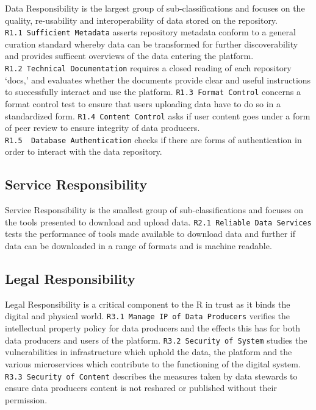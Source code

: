\documentclass{article}
\begin{document}
Data Responsibility is the largest group of sub-classifications and
focuses on the quality, re-usability and interoperability of data stored
on the repository. \texttt{R1.1\ Sufficient\ Metadata} asserts
repository metadata conform to a general curation standard whereby data
can be transformed for further discoverability and provides sufficent
overviews of the data entering the platform.
\texttt{R1.2\ Technical\ Documentation} requires a closed reading of
each repository `docs,' and evaluates whether the documents provide
clear and useful instructions to successfully interact and use the
platform. \texttt{R1.3\ Format\ Control} concerns a format control test
to ensure that users uploading data have to do so in a standardized
form. \texttt{R1.4\ Content\ Control} asks if user content goes under a
form of peer review to ensure integrity of data producers.
\texttt{R1.5\ \ Database\ Authentication} checks if there are forms of
authentication in order to interact with the data repository.

\hypertarget{service-responsibility}{%
\subsection{Service Responsibility}\label{service-responsibility}}

Service Responsibility is the smallest group of sub-classifications and
focuses on the tools presented to download and upload data.
\texttt{R2.1\ Reliable\ Data\ Services} tests the performance of tools
made available to download data and further if data can be downloaded in
a range of formats and is machine readable.

\hypertarget{legal-responsibility}{%
\subsection{Legal Responsibility}\label{legal-responsibility}}

Legal Responsibility is a critical component to the R in trust as it
binds the digital and physical world.
\texttt{R3.1\ Manage\ IP\ of\ Data\ Producers} verifies the intellectual
property policy for data producers and the effects this has for both
data producers and users of the platform.
\texttt{R3.2\ Security\ of\ System} studies the vulnerabilities in
infrastructure which uphold the data, the platform and the various
microservices which contribute to the functioning of the digital system.
\texttt{R3.3\ Security\ of\ Content} describes the measures taken by
data stewards to ensure data producers content is not reshared or
published without their permission.
\end{document}
